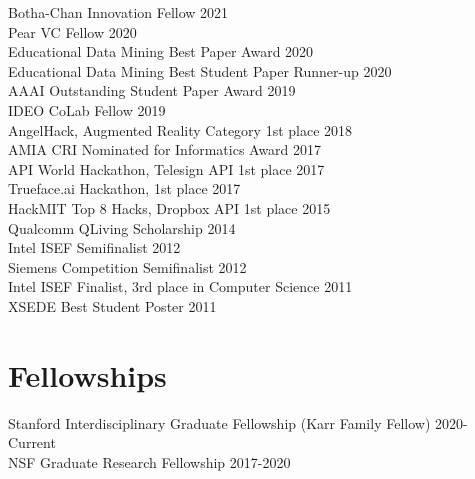\documentclass[margin, 10pt]{res} %
\begin{document}
\begin{resume}
Botha-Chan Innovation Fellow \hfill 2021 \\
Pear VC Fellow \hfill 2020 \\
Educational Data Mining Best Paper Award \hfill 2020 \\
Educational Data Mining Best Student Paper Runner-up \hfill 2020 \\
AAAI Outstanding Student Paper Award \hfill 2019 \\
IDEO CoLab Fellow \hfill 2019 \\
AngelHack, Augmented Reality Category 1st place \hfill 2018 \\
AMIA CRI Nominated for Informatics Award \hfill 2017 \\
API World Hackathon, Telesign API 1st place \hfill 2017 \\
Trueface.ai Hackathon, 1st place \hfill 2017 \\
HackMIT Top 8 Hacks, Dropbox API 1st place \hfill 2015 \\
Qualcomm QLiving Scholarship \hfill 2014 \\
Intel ISEF Semifinalist \hfill 2012 \\
Siemens Competition Semifinalist \hfill 2012 \\
Intel ISEF Finalist, 3rd place in Computer Science \hfill 2011 \\
XSEDE Best Student Poster \hfill 2011 \\

\section{Fellowships}
Stanford Interdisciplinary Graduate Fellowship (Karr Family Fellow) \hfill 2020-Current \\
NSF Graduate Research Fellowship \hfill 2017-2020 \\





\end{resume}
\end{document}
